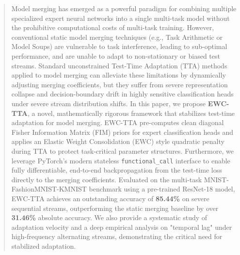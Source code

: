 \documentclass{article}
\theoremstyle{plain}
\theoremstyle{definition}
\theoremstyle{remark}
\begin{document}

\printAffiliationsAndNotice{}

\begin{abstract}
  Model merging has emerged as a powerful paradigm for combining multiple specialized expert neural networks into a single multi-task model without the prohibitive computational costs of multi-task training. However, conventional static model merging techniques (e.g., Task Arithmetic or Model Soups) are vulnerable to task interference, leading to sub-optimal performance, and are unable to adapt to non-stationary or biased test streams. Standard unconstrained Test-Time Adaptation (TTA) methods applied to model merging can alleviate these limitations by dynamically adjusting merging coefficients, but they suffer from severe representation collapse and decision-boundary drift in highly sensitive classification heads under severe stream distribution shifts. In this paper, we propose \textbf{EWC-TTA}, a novel, mathematically rigorous framework that stabilizes test-time adaptation for model merging. EWC-TTA pre-computes clean diagonal Fisher Information Matrix (FIM) priors for expert classification heads and applies an Elastic Weight Consolidation (EWC) style quadratic penalty during TTA to protect task-critical parameter structures. Furthermore, we leverage PyTorch's modern stateless \texttt{functional\_call} interface to enable fully differentiable, end-to-end backpropagation from the test-time loss directly to the merging coefficients. Evaluated on the multi-task MNIST-FashionMNIST-KMNIST benchmark using a pre-trained ResNet-18 model, EWC-TTA achieves an outstanding accuracy of \textbf{85.44\%} on severe sequential streams, outperforming the static merging baseline by over \textbf{31.46\%} absolute accuracy. We also provide a systematic study of adaptation velocity and a deep empirical analysis on "temporal lag" under high-frequency alternating streams, demonstrating the critical need for stabilized adaptation.
\end{abstract}
\end{document}
